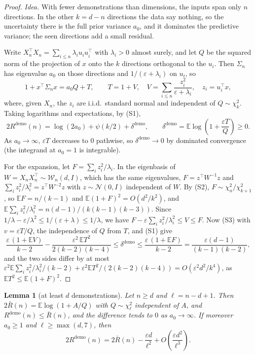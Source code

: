 \documentclass{article}
\newtheorem{lemma}[theorem]{Lemma}
\newcommand{\E}{\mathbb{E}}
\begin{document}
\begin{proof}
\emph{Idea.} With fewer demonstrations than dimensions, the inputs span only $n$ directions. In the other $k = d - n$ directions the data say nothing, so the uncertainty there is the full prior variance $a_0$, and it dominates the predictive variance; the seen directions add a small residual.

Write $X_n^\top X_n = \sum_{i \le n} \lambda_i u_i u_i^\top$ with $\lambda_i > 0$ almost surely, and let $Q$ be the squared norm of the projection of $x$ onto the $k$ directions orthogonal to the $u_i$. Then $\Sigma_n$ has eigenvalue $a_0$ on those directions and $1/(\varepsilon + \lambda_i)$ on $u_i$, so
\[
1 + x^\top \Sigma_n x = a_0 Q + T, \qquad T = 1 + V, \quad V = \sum_{i \le n} \frac{z_i^2}{\varepsilon + \lambda_i}, \quad z_i = u_i^\top x,
\]
where, given $X_n$, the $z_i$ are i.i.d.\ standard normal and independent of $Q \sim \chi^2_k$. Taking logarithms and expectations, by (S1),
\[
2R^{\mathrm{demo}}(n) = \log(2a_0) + \psi(k/2) + \delta^{\mathrm{demo}}, \qquad \delta^{\mathrm{demo}} = \E \log\!\left(1 + \frac{\varepsilon T}{Q}\right) \ge 0 .
\]
As $a_0 \to \infty$, $\varepsilon T$ decreases to $0$ pathwise, so $\delta^{\mathrm{demo}} \to 0$ by dominated convergence (the integrand at $a_0 = 1$ is integrable).

For the expansion, let $F = \sum_i z_i^2 / \lambda_i$. In the eigenbasis of $W = X_n X_n^\top \sim \mathcal{W}_n(d, I)$, which has the same eigenvalues, $F = z^\top W^{-1} z$ and $\sum_i z_i^2/\lambda_i^2 = z^\top W^{-2} z$ with $z \sim \mathcal{N}(0, I)$ independent of $W$. By (S2), $F \sim \chi^2_n / \chi^2_{k+1}$, so $\E F = n/(k-1)$ and $\E (1+F)^2 = O(d^2/k^2)$, and $\E \sum_i z_i^2/\lambda_i^2 = n(d-1)/(k(k-1)(k-3))$. Since $1/\lambda - \varepsilon/\lambda^2 \le 1/(\varepsilon + \lambda) \le 1/\lambda$, we have $F - \varepsilon \sum_i z_i^2/\lambda_i^2 \le V \le F$. Now (S3) with $v = \varepsilon T / Q$, the independence of $Q$ from $T$, and (S1) give
\[
\frac{\varepsilon\,(1 + \E V)}{k-2} - \frac{\varepsilon^2\, \E T^2}{2(k-2)(k-4)} \le \delta^{\mathrm{demo}} \le \frac{\varepsilon\,(1 + \E F)}{k-2} = \frac{\varepsilon (d-1)}{(k-1)(k-2)} ,
\]
and the two sides differ by at most $\varepsilon^2 \E \sum_i z_i^2/\lambda_i^2 /(k-2) + \varepsilon^2 \E T^2 / (2(k-2)(k-4)) = O(\varepsilon^2 d^2 / k^4)$, as $\E T^2 \le \E (1 + F)^2$.
\end{proof}

\begin{lemma}[at least $d$ demonstrations]\label{lem:many}
Let $n \ge d$ and $\ell = n - d + 1$. Then $2\bar R(n) = \E \log(1 + A/Q)$ with $Q \sim \chi^2_\ell$ independent of $A$, and $R^{\mathrm{demo}}(n) \le \bar R(n)$, and the difference tends to $0$ as $a_0 \to \infty$. If moreover $a_0 \ge 1$ and $\ell \ge \max(d, 7)$, then
\[
2R^{\mathrm{demo}}(n) = 2\bar R(n) - \frac{\varepsilon d}{\ell^2} + O\!\left(\frac{\varepsilon d^2}{\ell^3}\right).
\]
\end{lemma}
\end{document}
